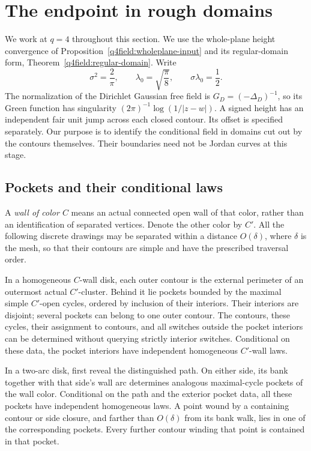 \section{The endpoint in rough domains}
\label{sec:q4rough}

We work at $q=4$ throughout this section.  We use the whole-plane
height convergence of Proposition~\ref{q4field:wholeplane-input}
and its regular-domain form, Theorem~\ref{q4field:regular-domain}.
Write
\[
 \sigma^2=\frac{2}{\pi},\qquad \lambda_0=\sqrt{\frac{\pi}{8}},
 \qquad \sigma\lambda_0=\frac12.
\]
The normalization of the Dirichlet Gaussian free field is
$G_D=(-\Delta_D)^{-1}$, so its Green function has singularity
$(2\pi)^{-1}\log(1/|z-w|)$.  A signed height has an independent fair
unit jump across each closed contour.  Its offset is specified separately.
Our purpose is to identify the conditional field in domains cut out by
the contours themselves.  Their boundaries need not be Jordan curves at
this stage.

\subsection{Pockets and their conditional laws}

A \emph{wall of color $C$} means an actual connected open wall of that
color, rather than an identification of separated vertices.  Denote the
other color by $C'$.  All the following discrete drawings may be separated
within a distance $O(\delta)$, where $\delta$ is the mesh, so that their
contours are simple and have the prescribed traversal order.

\begin{lemma}
\label{q4pocket:discrete-pockets}
In a homogeneous $C$-wall disk, each outer contour is the external
perimeter of an outermost actual $C'$-cluster.  Behind it lie pockets
bounded by the maximal simple $C'$-open cycles, ordered by inclusion of
their interiors.  Their interiors are disjoint; several pockets can
belong to one outer contour.  The contours, these cycles, their
assignment to contours, and all switches outside the pocket interiors
can be determined without querying strictly interior switches.
Conditional on these data, the pocket interiors have independent
homogeneous $C'$-wall laws.

In a two-arc disk, first reveal the distinguished path.  On either side,
its bank together with that side's wall arc determines analogous
maximal-cycle pockets of the wall color.  Conditional on the path and
the exterior pocket data, all these pockets have independent
homogeneous laws.  A point wound by a containing contour or side
closure, and farther than $O(\delta)$ from its bank walk, lies in one of
the corresponding pockets.  Every further contour winding that point
is contained in that pocket.
\end{lemma}

